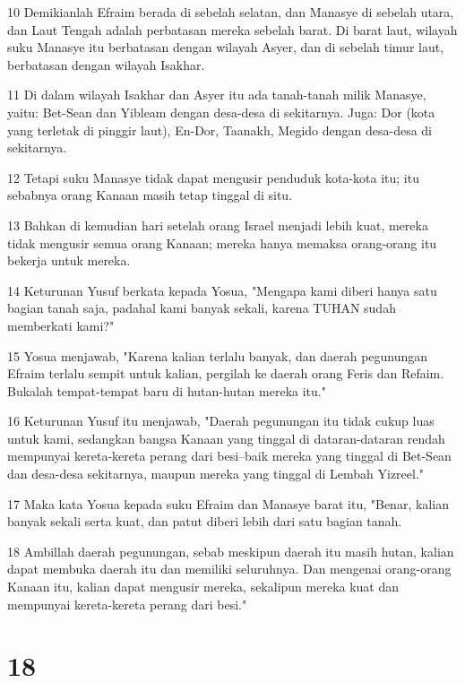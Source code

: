 \par 10 Demikianlah Efraim berada di sebelah selatan, dan Manasye di sebelah utara, dan Laut Tengah adalah perbatasan mereka sebelah barat. Di barat laut, wilayah suku Manasye itu berbatasan dengan wilayah Asyer, dan di sebelah timur laut, berbatasan dengan wilayah Isakhar.
\par 11 Di dalam wilayah Isakhar dan Asyer itu ada tanah-tanah milik Manasye, yaitu: Bet-Sean dan Yibleam dengan desa-desa di sekitarnya. Juga: Dor (kota yang terletak di pinggir laut), En-Dor, Taanakh, Megido dengan desa-desa di sekitarnya.
\par 12 Tetapi suku Manasye tidak dapat mengusir penduduk kota-kota itu; itu sebabnya orang Kanaan masih tetap tinggal di situ.
\par 13 Bahkan di kemudian hari setelah orang Israel menjadi lebih kuat, mereka tidak mengusir semua orang Kanaan; mereka hanya memaksa orang-orang itu bekerja untuk mereka.
\par 14 Keturunan Yusuf berkata kepada Yosua, "Mengapa kami diberi hanya satu bagian tanah saja, padahal kami banyak sekali, karena TUHAN sudah memberkati kami?"
\par 15 Yosua menjawab, "Karena kalian terlalu banyak, dan daerah pegunungan Efraim terlalu sempit untuk kalian, pergilah ke daerah orang Feris dan Refaim. Bukalah tempat-tempat baru di hutan-hutan mereka itu."
\par 16 Keturunan Yusuf itu menjawab, "Daerah pegunungan itu tidak cukup luas untuk kami, sedangkan bangsa Kanaan yang tinggal di dataran-dataran rendah mempunyai kereta-kereta perang dari besi--baik mereka yang tinggal di Bet-Sean dan desa-desa sekitarnya, maupun mereka yang tinggal di Lembah Yizreel."
\par 17 Maka kata Yosua kepada suku Efraim dan Manasye barat itu, "Benar, kalian banyak sekali serta kuat, dan patut diberi lebih dari satu bagian tanah.
\par 18 Ambillah daerah pegunungan, sebab meskipun daerah itu masih hutan, kalian dapat membuka daerah itu dan memiliki seluruhnya. Dan mengenai orang-orang Kanaan itu, kalian dapat mengusir mereka, sekalipun mereka kuat dan mempunyai kereta-kereta perang dari besi."

\chapter{18}

